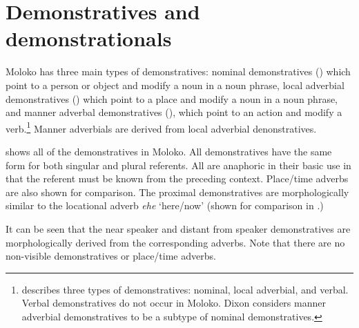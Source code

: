 \section{Demonstratives and demonstrationals}\label{sec:3.2}
\hypertarget{RefHeading1210941525720847}{}
Moloko has three main types of demonstratives: nominal demonstratives () which point to a person or object and modify a noun in a noun phrase, local adverbial demonstratives () which point to a place and modify a noun in a noun phrase, and manner adverbal demonstratives (), which point to an action and modify a verb.\footnote{\citet{Dixon2003} describes three types of demonstratives: nominal, local adverbial, and verbal. Verbal demonstratives do not occur in Moloko. Dixon considers manner adverbial demonstratives to be a subtype of nominal demonstratives.} Manner adverbials are derived from local adverbial denonstratives. 

 shows all of the demonstratives in Moloko. All demonstratives have the same form for both singular and plural referents.  All are anaphoric in their basic use in that the referent must be known from the preceding context. Place/time adverbs are also shown for comparison. The proximal demonstratives are morphologically similar to the locational adverb \textit{ehe} ‘here/now’ (shown for comparison in .)

It can be seen that the near speaker and distant from speaker demonstratives are morphologically derived from the corresponding adverbs. Note that there are no non-visible demonstratives or place/time adverbs.

